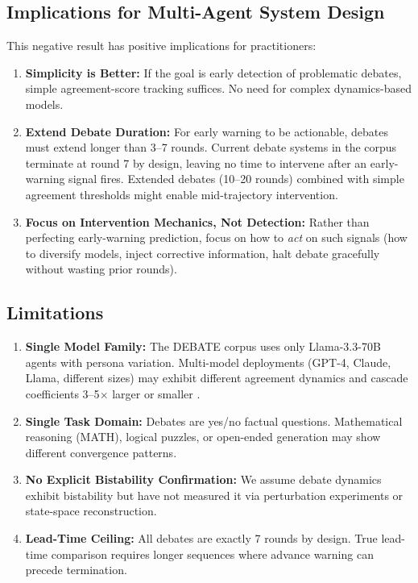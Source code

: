 \documentclass[11pt,letterpaper]{article}
\begin{document}
\subsection{Implications for Multi-Agent System Design}

This negative result has positive implications for practitioners:

\begin{enumerate}
\item \textbf{Simplicity is Better:} If the goal is early detection of problematic debates, simple agreement-score tracking suffices. No need for complex dynamics-based models.

\item \textbf{Extend Debate Duration:} For early warning to be actionable, debates must extend longer than 3--7 rounds. Current debate systems in the corpus terminate at round 7 by design, leaving no time to intervene after an early-warning signal fires. Extended debates (10--20 rounds) combined with simple agreement thresholds might enable mid-trajectory intervention.

\item \textbf{Focus on Intervention Mechanics, Not Detection:} Rather than perfecting early-warning prediction, focus on how to \emph{act} on such signals (how to diversify models, inject corrective information, halt debate gracefully without wasting prior rounds).
\end{enumerate}

\subsection{Limitations}

\begin{enumerate}
\item \textbf{Single Model Family:} The DEBATE corpus uses only Llama-3.3-70B agents with persona variation. Multi-model deployments (GPT-4, Claude, Llama, different sizes) may exhibit different agreement dynamics and cascade coefficients 3--5$\times$ larger or smaller \citep{Liu2026}.

\item \textbf{Single Task Domain:} Debates are yes/no factual questions. Mathematical reasoning (MATH), logical puzzles, or open-ended generation may show different convergence patterns.

\item \textbf{No Explicit Bistability Confirmation:} We assume debate dynamics exhibit bistability but have not measured it via perturbation experiments or state-space reconstruction.

\item \textbf{Lead-Time Ceiling:} All debates are exactly 7 rounds by design. True lead-time comparison requires longer sequences where advance warning can precede termination.
\end{enumerate}
\end{document}
